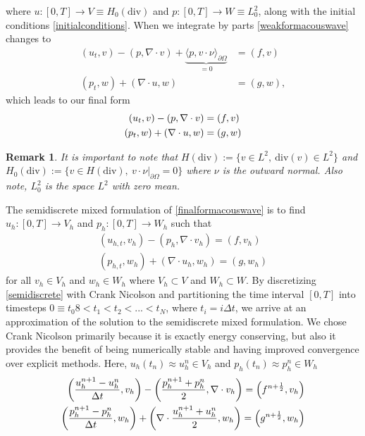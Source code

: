 \documentclass[11pt]{article}
\newtheorem{remark}{Remark}[section]
\newcommand{\divv}{\mathrm{div}}
\begin{document}
where $u:[0,T] \rightarrow V \equiv H_0(\divv)$ and $p:[0,T] \rightarrow W \equiv L_0^2$, along with the initial conditions \eqref{initialconditions}.
When we integrate by parts \eqref{weakformacouswave} changes to 
\begin{equation}
\begin{split}
(u_t,v) - (p,\nabla \cdot v) + \underbrace{\langle p, v \cdot \nu \rangle_{\partial\Omega}}_{=0} &= (f,v) \\
(p_t, w) + (\nabla \cdot u,w) &= (g,w),
\end{split}
\end{equation}
which leads to our final form 
\begin{equation}{\label{finalformacouswave}}
\begin{split}
(u_t,v) - (p,\nabla \cdot v) &= (f,v)\\
(p_t, w) + (\nabla \cdot u,w) &= (g,w)
\end{split}
\end{equation}
\begin{remark}
	It is important to note that $H(\divv):= \{v \in L^2,\: \divv(v) \in L^2\}$ and $H_0(\divv) := \{ v\in H(\divv),\: v \cdot \nu|_{\partial \Omega} = 0 \}$ where $\nu$ is the outward normal. Also note, $L^2_0$ is the space $L^2$ with zero mean.
\end{remark}
The semidiscrete mixed formulation of \eqref{finalformacouswave} is to find $u_h:[0,T] \rightarrow V_h$ and $p_h:[0,T] \rightarrow W_h$ such that
\begin{equation}\label{semidiscrete}
\begin{split}
(u_{h,t},v_h) - (p_h,\nabla \cdot v_h) = (f,v_h)\\
(p_{h,t}, w_h) + (\nabla \cdot u_h,w_h) = (g,w_h)
\end{split}
\end{equation}
for all $v_h \in V_h$ and $w_h \in W_h$ where $V_h \subset V$ and $W_h \subset W$.
By discretizing \eqref{semidiscrete} with Crank Nicolson and partitioning the time interval $[0,T]$ into timesteps $0 \equiv t_0 8< t_1 < t_2 < ... < t_N$, where $t_i = i\Delta t$, we arrive at an approximation of the solution to the semidiscrete mixed formulation. We chose Crank Nicolson primarily because it is exactly energy conserving, but also it provides the benefit of being numerically stable and having improved convergence over explicit methods. Here, $u_h(t_n) \approx u^n_h \in V_h$ and $p_h(t_n) \approx p^n_h \in W_h$
\begin{equation}{\label{cnacoustic}}
\begin{split}
\left(\frac{u^{n+1}_h-u^n_h}{\Delta t},v_h\right)-\left(\frac{p^{n+1}_h+p^n_h}{2},\nabla \cdot v_h\right) = \left(f^{n+\frac{1}{2}},v_h\right) \\
\left(\frac{p^{n+1}_h-p^n_h}{\Delta t},w_h\right)+\left(\nabla \cdot \frac{u^{n+1}_h+u^n_h}{2},w_h\right) = \left(g^{n+\frac{1}{2}},w_h\right)
\end{split}
\end{equation}
\end{document}
